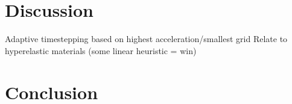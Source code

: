 \documentclass[twoside]{article}
\begin{document}
\begin{multicols}{2}


\section{Discussion}

Adaptive timestepping based on highest acceleration/smallest grid
Relate to hyperelastic materials (some linear heuristic = win)


\section{Conclusion}





\end{multicols}
\end{document}
